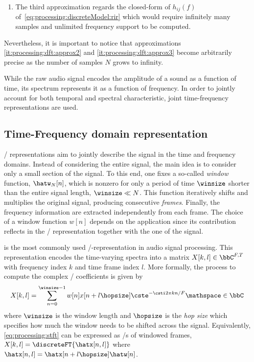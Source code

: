 \begin{enumerate}[label=(\roman*)]
    \item\label{it:processing:dft:approx3}
    The third approximation regards the closed-form of $h_{ij}(f)$ of~\cref{eq:processing:discreteModel:rir} which
    would require infinitely many samples and unlimited frequency support to be computed.
\end{enumerate}

Nevertheless, it is important to notice that approximations \ref{it:processing:dft:approx2} and \ref{it:processing:dft:approx3} become arbitrarily precise as the number of samples $N$ grows to infinity.

\mynewline
While the raw audio signal encodes the amplitude of a sound as a function of time,
its spectrum represents it as a function of frequency.
In order to jointly account for both temporal and spectral characteristic, joint time-frequency representations are used.

\subsection{Time-Frequency domain representation}
\TFdef/ representations aim to jointly describe the signal in the time and frequency domains.
Instead of considering the entire signal, the main idea is to consider only a small section of the signal.
To this end, one fixes a so-called \textit{window} function, $\hatw_N[n]$, which is nonzero for only a period of time $\winsize$ shorter than the entire signal length, $\winsize \ll N$.
This function iteratively shifts and multiplies the original signal, producing consecutive \textit{frames}.
Finally, the frequency information are extracted independently from each frame.
The choice of a window function $w[n]$ depends on the application since its contribution reflects in the \TF/ representation together with the
one of the signal.

is the most commonly used \TF/-representation in audio signal processing.
This representation encodes the time-varying spectra into a matrix $X[k,l] \in \bbC^{F,T}$ with frequency index $k$ and time frame index $l$.
More formally, the process to compute the complex \STFT/ coefficients is given by
\begin{equation}\label{eq:processing:stft}
    X[k, l]  = \sum_{n=0}^{\winsize-1} w[n] x[n + l \hopsize] \cste^{- \csti 2 \pi k n / F} \mathspace\in\bbC
\end{equation}
where $\winsize$ is the window length and $\hopsize$ is the \textit{hop size} which specifies how much the window needs to be shifted across the signal.
Equivalently, \cref{eq:processing:stft} can be expressed as \DFT/s of windowed frames, $X[k, l] = \discreteFT{\hatx[n,l]}$ where $\hatx[n,l] = \hatx[n + l \hopsize] \hatw[n]$.

